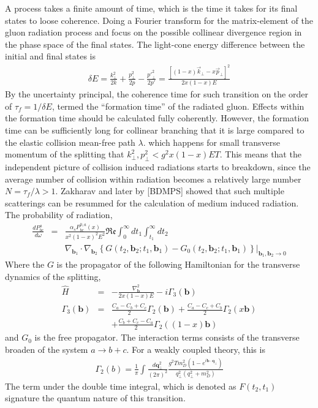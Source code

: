 A process takes a finite amount of time, which is the time it takes for its final states to loose coherence. 
Doing a Fourier transform for the matrix-element of the gluon radiation process and focus on the possible collinear divergence region in the phase space of the final states.
The light-cone energy difference between the initial and final states is 
\begin{eqnarray}
\delta E = \frac{k_\perp^2}{2k} + \frac{p_\perp^2}{2p} - \frac{{p'}_\perp^2}{2{p'}} = \frac{ [(1-x)\vec{k}_\perp - x\vec{p}_\perp]^2}{2x(1-x)E}
\end{eqnarray}
By the uncertainty principal, the coherence time for such transition on the order of $\tau_f = 1/\delta E$, termed the ``formation time'' of the radiated gluon. 
Effects within the formation time should be calculated fully coherently.
However, the formation time can be sufficiently long for collinear branching that it is large compared to the elastic collision mean-free path $\lambda$.
which happens for small transverse momentum of the splitting that $k_\perp^2, p_\perp^2 < g^2x(1-x)ET$.
This means that the independent picture of collision induced radiations starts to breakdown, since the average number of collision within radiation becomes a relatively large number $N = \tau_f/\lambda >1$.
Zakharav and later by [BDMPS] showed that such multiple scatterings can be resummed for the calculation of medium induced radiation.
The probability of radiation,
\begin{eqnarray}
\nonumber
\frac{dP^{a}_{bc}}{d\omega} &=& \frac{\alpha_s P^{0,a}_{bc}(x)}{x^2(1-x)^2 E^2}\mathfrak{Re}\int_0^\infty dt_1 \int_{t_1}^{\infty} dt_2\\ &&\nabla_{\mathbf{b}_1} \cdot\nabla_{\mathbf{b}_2} \left\{G(t_2, \mathbf{b}_2; t_1, \mathbf{b}_1) - G_0(t_2, \mathbf{b}_2; t_1, \mathbf{b}_1) \right\}|_{\mathbf{b}_1, \mathbf{b}_2 \rightarrow 0}
\end{eqnarray}
Where the $G$ is the propagator of the following Hamiltonian for the transverse dynamics of the splitting,
\begin{eqnarray}
\hat{H} &=& - \frac{\nabla^2_{\mathbf{b}}}{2x(1-x)E} - i \Gamma_3(\mathbf{b})\\
\Gamma_3(\mathbf{b}) &=& \frac{C_a-C_b+C_c}{2}\Gamma_2(\mathbf{b}) + \frac{C_a-C_c+C_b}{2}\Gamma_2(x\mathbf{b}) \\
&&+ \frac{C_b+C_c-C_a}{2}\Gamma_2((1-x)\mathbf{b})
\end{eqnarray}
and $G_0$ is the free propagator.
The interaction terms consists of the transverse broaden of the system $a\rightarrow b+c$. 
For a weakly coupled theory, this is
\begin{eqnarray}
\Gamma_2(b) = \frac{1}{\pi}\int \frac{d\mathbf{q}_\perp^2}{(2\pi)^2} \frac{g^2 T m_D^2 (1-e^{i\mathbf{b}\cdot\mathbf{q_\perp}})}{q_\perp^2(q_\perp^2+m_D^2)}
\end{eqnarray}
The term under the double time integral, which is denoted as $F(t_2, t_1)$ signature the quantum nature of this transition. 

